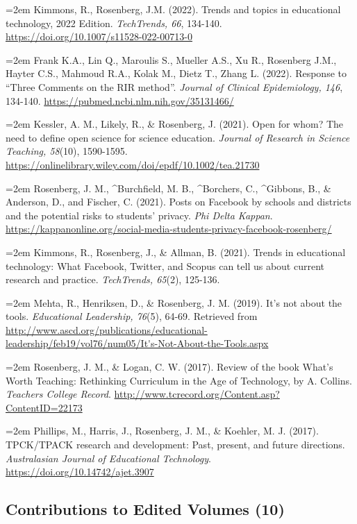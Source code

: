 \documentclass[
  14,
]{article}
\begin{document}
\hangindent=2em Kimmons, R., Rosenberg, J.M. (2022). Trends and topics
in educational technology, 2022 Edition. \emph{TechTrends, 66}, 134-140.
\url{https://doi.org/10.1007/s11528-022-00713-0}

\hangindent=2em Frank K.A., Lin Q., Maroulis S., Mueller A.S., Xu R.,
Rosenberg J.M., Hayter C.S., Mahmoud R.A., Kolak M., Dietz T., Zhang L.
(2022). Response to ``Three Comments on the RIR method''. \emph{Journal
of Clinical Epidemiology, 146}, 134-140.
\url{https://pubmed.ncbi.nlm.nih.gov/35131466/}

\hangindent=2em Kessler, A. M., Likely, R., \& Rosenberg, J. (2021).
Open for whom? The need to define open science for science education.
\emph{Journal of Research in Science Teaching, 58}(10), 1590-1595.
\url{https://onlinelibrary.wiley.com/doi/epdf/10.1002/tea.21730}

\hangindent=2em Rosenberg, J. M., \^{}Burchfield, M. B., \^{}Borchers,
C., \^{}Gibbons, B., \& Anderson, D., and Fischer, C. (2021). Posts on
Facebook by schools and districts and the potential risks to students'
privacy. \emph{Phi Delta Kappan}.
\url{https://kappanonline.org/social-media-students-privacy-facebook-rosenberg/}

\hangindent=2em Kimmons, R., Rosenberg, J., \& Allman, B. (2021). Trends
in educational technology: What Facebook, Twitter, and Scopus can tell
us about current research and practice. \emph{TechTrends, 65}(2),
125-136.

\hangindent=2em Mehta, R., Henriksen, D., \& Rosenberg, J. M. (2019).
It's not about the tools. \emph{Educational Leadership, 76}(5), 64-69.
Retrieved from
\url{http://www.ascd.org/publications/educational-leadership/feb19/vol76/num05/It's-Not-About-the-Tools.aspx}

\hangindent=2em Rosenberg, J. M., \& Logan, C. W. (2017). Review of the
book What's Worth Teaching: Rethinking Curriculum in the Age of
Technology, by A. Collins. \emph{Teachers College Record}.
\url{http://www.tcrecord.org/Content.asp?ContentID=22173}

\hangindent=2em Phillips, M., Harris, J., Rosenberg, J. M., \& Koehler,
M. J. (2017). TPCK/TPACK research and development: Past, present, and
future directions. \emph{Australasian Journal of Educational
Technology}. \url{https://doi.org/10.14742/ajet.3907}

\hypertarget{contributions-to-edited-volumes-10}{%
\subsection{Contributions to Edited Volumes
(10)}\label{contributions-to-edited-volumes-10}}
\end{document}
